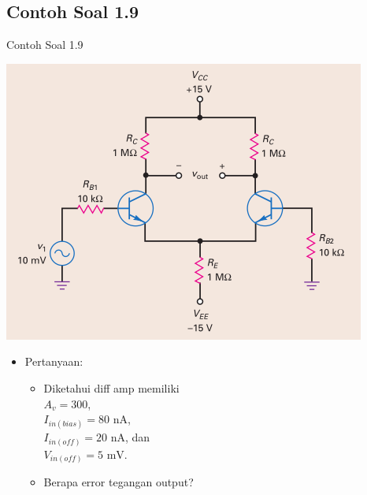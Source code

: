 \documentclass[aspectratio=169]{beamer}
\begin{document}
\subsection{Contoh Soal 1.9}
\begin{frame}{Contoh Soal 1.9}
	\begin{multicols}{2}
		\begin{center}
			\includegraphics[height=0.7\textheight]{gambar/01.contoh_soal_9}
		\end{center}
		\columnbreak
		\begin{itemize}
			\item Pertanyaan:
			\begin{itemize}
				\item Diketahui diff amp memiliki\\
				$ A_v = 300 $, \\
				$ I_{in(bias)} = 80 \text{ nA}$, \\
				$ I_{in(off)} = 20 \text{ nA}$, dan \\
				$ V_{in(off)} = 5 \text{ mV}$.
				\item Berapa error tegangan output?
			\end{itemize}
		\end{itemize}
	\end{multicols}
\end{frame}
\end{document}
